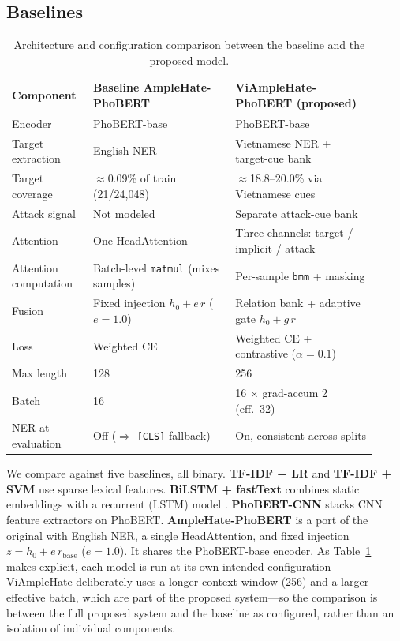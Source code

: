 \documentclass[11pt]{article}
\begin{document}
\subsection{Baselines}
\begin{table}[!t]
  \centering
  \small
  \begin{tabular}{p{0.20\linewidth} p{0.36\linewidth} p{0.36\linewidth}}
    \toprule
    \textbf{Component} & \textbf{Baseline AmpleHate-PhoBERT} & \textbf{ViAmpleHate-PhoBERT (proposed)} \\
    \midrule
    Encoder & PhoBERT-base & PhoBERT-base \\
    Target extraction & English NER & Vietnamese NER + target-cue bank \\
    Target coverage & $\approx$0.09\% of train (21/24{,}048) & $\approx$18.8--20.0\% via Vietnamese cues \\
    Attack signal & Not modeled & Separate attack-cue bank \\
    Attention & One HeadAttention & Three channels: target / implicit / attack \\
    Attention computation & Batch-level \texttt{matmul} (mixes samples) & Per-sample \texttt{bmm} + masking \\
    Fusion & Fixed injection $h_0+e\,r$ ($e{=}1.0$) & Relation bank + adaptive gate $h_0+g\,r$ \\
    Loss & Weighted CE & Weighted CE + contrastive ($\alpha{=}0.1$) \\
    Max length & 128 & 256 \\
    Batch & 16 & 16 $\times$ grad-accum 2 (eff.\ 32) \\
    NER at evaluation & Off ($\Rightarrow$ \texttt{[CLS]} fallback) & On, consistent across splits \\
    \bottomrule
  \end{tabular}
  \caption{Architecture and configuration comparison between the baseline and the proposed model.}
  \label{tab:arch}
\end{table}

We compare against five baselines, all binary. \textbf{TF-IDF + LR} and \textbf{TF-IDF + SVM} use sparse lexical features. \textbf{BiLSTM + fastText} \citep{fasttext} combines static embeddings with a recurrent (LSTM) model \citep{hochreiter1997lstm}. \textbf{PhoBERT-CNN} \citep{to2022phobertcnn} stacks CNN feature extractors on PhoBERT. \textbf{AmpleHate-PhoBERT} is a port of the original with English NER, a single HeadAttention, and fixed injection $z=h_0+e\,r_{\mathrm{base}}$ ($e=1.0$). It shares the PhoBERT-base encoder. As Table~\ref{tab:arch} makes explicit, each model is run at its own intended configuration---ViAmpleHate deliberately uses a longer context window (256) and a larger effective batch, which are part of the proposed system---so the comparison is between the full proposed system and the baseline as configured, rather than an isolation of individual components.
\end{document}
